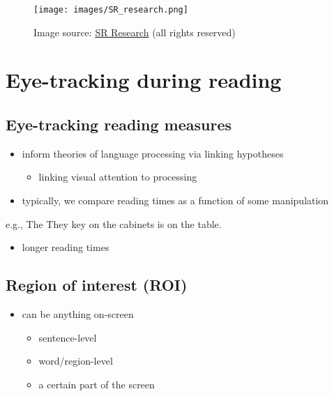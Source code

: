 \documentclass[
  letterpaper,
  DIV=11,
  numbers=noendperiod]{scrartcl}
\providecommand{\tightlist}{%
  \setlength{\itemsep}{0pt}\setlength{\parskip}{0pt}}\usepackage{longtable,booktabs,array}
\begin{document}
\begin{figure}[H]

{\centering \texttt{[image: images/SR\_research.png]}

}

\caption{Image source:
\href{https://www.sr-research.com/about-eye-tracking/}{SR Research} (all
rights reserved)}

\end{figure}

\hypertarget{eye-tracking-during-reading}{%
\section{Eye-tracking during
reading}\label{eye-tracking-during-reading}}

\hypertarget{eye-tracking-reading-measures}{%
\subsection{Eye-tracking reading
measures}\label{eye-tracking-reading-measures}}

\begin{itemize}
\tightlist
\item
  inform theories of language processing via linking hypotheses

  \begin{itemize}
  \tightlist
  \item
    linking visual attention to processing
  \end{itemize}
\item
  typically, we compare reading times as a function of some manipulation
\end{itemize}

e.g., The They key on the cabinets is on the table.

\begin{itemize}
\tightlist
\item
  longer reading times
\end{itemize}

\hypertarget{region-of-interest-roi}{%
\subsection{Region of interest (ROI)}\label{region-of-interest-roi}}

\begin{itemize}
\tightlist
\item
  can be anything on-screen

  \begin{itemize}
  \tightlist
  \item
    sentence-level
  \item
    word/region-level
  \item
    a certain part of the screen
  \end{itemize}
\end{itemize}
\end{document}
